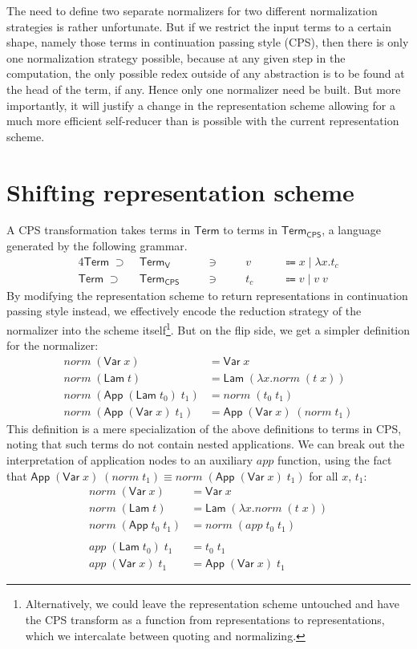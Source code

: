 \documentclass[a4paper]{amsart}
\newcommand{\sep}{\;|\;}
\newcommand{\Var}{\mathsf{Var}\;}
\newcommand{\Lam}{\mathsf{Lam}\;}
\newcommand{\App}{\mathsf{App}\;}
\newcommand{\Term}{\mathsf{Term}}
\newcommand{\Termcps}{\mathsf{Term_{CPS}}}
\newcommand{\Termval}{\mathsf{Term_{V}}}
\begin{document}
The need to define two separate normalizers for two different normalization
strategies is rather unfortunate. But if we restrict the input terms to a
certain shape, namely those terms in continuation passing style (CPS), then
there is only one normalization strategy possible, because at any given step
in the computation, the only possible redex outside of any abstraction is to
be found at the head of the term, if any. Hence only one normalizer need be
built. But more importantly, it will justify a change in the representation
scheme allowing for a much more efficient self-reducer than is possible with
the current representation scheme.

\section{Shifting representation scheme}

A CPS transformation takes terms in $\Term$ to terms in $\Termcps$, a language
generated by the following grammar.
\begin{alignat*}{4}
\Term \;\supset\; &\Termval &\quad&\ni&\quad& v &\quad&\Coloneqq x
\sep \lambda x.t_c \\
\Term \;\supset\; &\Termcps &\quad&\ni&\quad& t_c &\quad&\Coloneqq v
\sep v\;v
\end{alignat*}
By modifying the representation scheme to return representations in
continuation passing style instead, we effectively encode the reduction
strategy of the normalizer into the scheme itself\footnote{Alternatively, we
  could leave the representation scheme untouched and have the CPS transform
  as a function from representations to representations, which we intercalate
  between quoting and normalizing.}. But on the flip side, we get a simpler
definition for the normalizer:
\begin{align*}
  norm\;(\Var x) &= \Var x \\
  norm\;(\Lam t) &= \Lam (\lambda x. norm\;(t\;x)) \\
  norm\;(\App (\Lam t_0)\;t_1) &= norm\;(t_0\;t_1) \\
  norm\;(\App (\Var x)\;t_1) &= \App (\Var x)\;(norm\;t_1)
\end{align*}
This definition is a mere specialization of the above definitions to terms in
CPS, noting that such terms do not contain nested applications. We can break
out the interpretation of application nodes to an auxiliary $app$ function,
using the fact that $\App (\Var x)\;(norm\;t_1) \equiv norm\;(\App (\Var
x)\;t_1)$ for all $x$, $t_1$:
\begin{align*}
  norm\;(\Var x) &= \Var x \\
  norm\;(\Lam t) &= \Lam (\lambda x. norm\;(t\;x)) \\
  norm\;(\App t_0\;t_1) &= norm\;(app\;t_0\;t_1) \\
  \\
  app\;(\Lam t_0)\;t_1 &= t_0\;t_1 \\
  app\;(\Var x)\;t_1 &= \App (\Var x)\;t_1
\end{align*}
\end{document}
